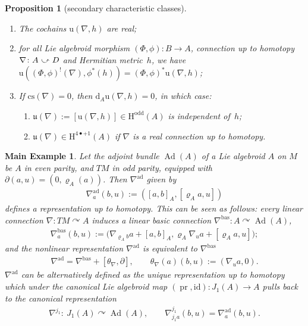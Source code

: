 \documentclass[11pt]{article}
\numberwithin{equation}{section}
\newcommand{\acts}{\curvearrowright}
\newcommand{\homo}{ \ \raisebox{\depth}{\scalebox{1}[-1]{$\curvearrowright$}} \ }
\newcommand{\bd}{\partial}
\newcommand{\pr}{\operatorname{pr}}
\newcommand{\dd}{\mathrm{d}}
\newcommand{\id}{\mathrm{id}}
\newcommand{\8}{\infty}
\newtheorem*{main_example}{Main Example}
\newtheorem{proposition}{Proposition}
\begin{document}
\begin{proposition}[secondary characteristic classes]\label{pro : secondary}\quad
 \begin{enumerate}\itemsep=0pt
 \item[$a)$] The cochains $\mathrm{u}(\nabla,h)$ are real;
 \item[$b)$] for all Lie algebroid morphism $(\Phi,\phi)\colon B \to A$, connection up to homotopy $\nabla\colon A \homo D$ and Hermitian metric~$h$, we have $\mathrm{u}((\Phi,\phi)^!(\nabla),\phi^*(h)) = (\Phi,\phi)^*\mathrm{u}(\nabla,h)$;
 \item[$c)$] If $\mathrm{cs}(\nabla)=0$, then $\dd_A\mathrm{u}(\nabla,h)=0$, in which case:
 \begin{enumerate}\itemsep=0pt
 \item[$i)$] $\mathfrak{u}(\nabla):=[\mathrm{u}(\nabla,h)] \in \mathrm{H}^{\mathrm{odd}}(A)$ is independent of~$h$;
 \item[$ii)$] $\mathfrak{u}(\nabla) \in \mathrm{H}^{4\bullet+1}(A)$ if $\nabla$ is a real connection up to homotopy.
 \end{enumerate}
 \end{enumerate}
\end{proposition}

\begin{main_example}Let the \emph{adjoint bundle} $\operatorname{Ad}(A)$ of a Lie algebroid $A$ on $M$ be $A$ in even parity, and $TM$ in odd parity, equipped with $\bd(a,u) = (0,\varrho_A(a))$. Then $\nabla^{\mathrm{ad}}$ given by
\begin{gather*}
 \nabla^{\mathrm{ad}}_a(b,u):=([a,b]_A,[\varrho_Aa,u])
\end{gather*}defines a representation up to homotopy. This can be seen as follows:
every linear connection $\nabla\colon TM \acts A$ induces a linear {\it basic connection} $\nabla^{\mathrm{bas}} \colon A \acts \operatorname{Ad}(A)$,
\begin{align*}
\nabla^{\mathrm{bas}}_a(b,u):=\big(\nabla_{\varrho_A b}a+[a,b]_A,\varrho_A\nabla_{u}a+[\varrho_A a,u]\big);
\end{align*}and the nonlinear representation $\nabla^{\mathrm{ad}}$ is equivalent to $\nabla^{\mathrm{bas}}$
\begin{gather*}
\nabla^{\mathrm{ad}}=\nabla^{\mathrm{bas}} + [\theta_{\nabla},\bd], \qquad \theta_{\nabla}(a)(b,u):=(\nabla_ua,0).
\end{gather*}$\nabla^{\mathrm{ad}}$ can be alternatively defined as the unique representation up to homotopy which under the canonical Lie algebroid map $(\pr,\id)\colon J_1(A) \to A$ pulls back to the canonical representation
\begin{gather*}
\nabla^{j_1}\colon \ J_1(A) \acts \operatorname{Ad}(A), \qquad \nabla^{j_1}_{j_1a}(b,u) = \nabla^{\mathrm{ad}}_a(b,u).
\end{gather*}
\end{main_example}
\end{document}
